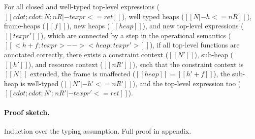 \begin{theorem}
For all closed and well-typed top-level expressions
($[[ cdot ; cdot ; N ; nR |- texpr <= ret ]]$),
well typed heaps ($[[ N |- h <= nR ]]$),
frame-heaps ($[[ f ]]$),
new heaps ($[[ heap ]]$),
and new top-level expressions ($[[ texpr' ]]$),
which are connected by a step in the operational semantics
($[[ < h + f ; texpr > -->  < heap ; texpr' > ]]$),
if all top-level functions are annotated correctly,
there exists a constraint context ($[[ N' ]]$),
sub-heap ($[[ h' ]]$),
and resource context ($[[ nR' ]]$),
such that the constraint context is $[[ N ]]$ extended,
the frame is unaffected ($[[ heap ]] = [[ h' + f ]]$),
the sub-heap is well-typed ($[[ N' |- h' <= nR' ]]$),
and the top-level expression too
($[[ cdot ; cdot ; N' ; nR' |- texpr' <= ret ]]$).
\end{theorem}

\paragraph{Proof sketch.} Induction over the typing assumption. Full proof in
appendix.
